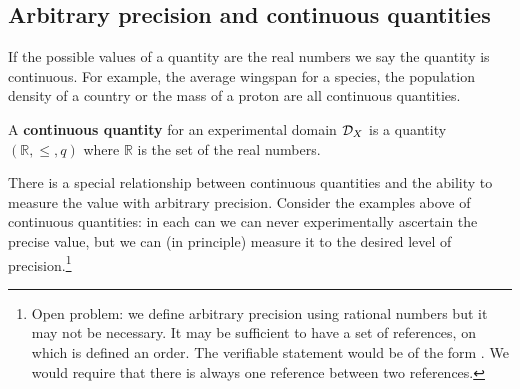 \documentclass[11pt,letterpaper,fleqn]{memoir} %
\begin{document}
\subsection{Arbitrary precision and continuous quantities}

If the possible values of a quantity are the real numbers we say the quantity is continuous. For example, the average wingspan for a species, the population density of a country or the mass of a proton are all continuous quantities.

\begin{mathSection}
	\begin{defn}
		A \textbf{continuous quantity} for an experimental domain $\mathcal{D}_X$ is a quantity $(\mathbb{R}, \leq, q)$ where $\mathbb{R}$ is the set of the real numbers.
	\end{defn}
\end{mathSection}

There is a special relationship between continuous quantities and the ability to measure the value with arbitrary precision. Consider the examples above of continuous quantities: in each can we can never experimentally ascertain the precise value, but we can (in principle) measure it to the desired level of precision.\footnote{Open problem: we define arbitrary precision using rational numbers but it may not be necessary. It may be sufficient to have a set of references, on which is defined an order. The verifiable statement would be of the form . We would require that there is always one reference between two references.}
\end{document}
